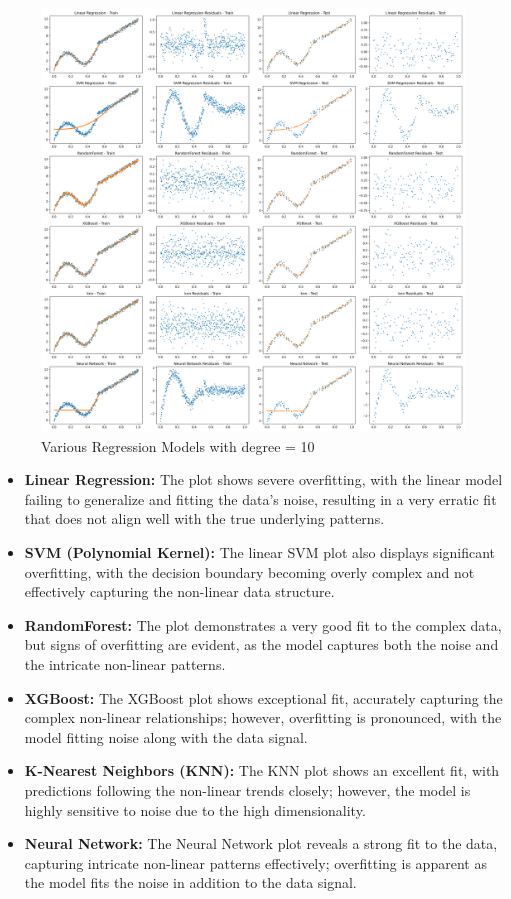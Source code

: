 \begin{figure}[H]
	\centering
	\includegraphics[width=0.8\linewidth]{./Images/E3-MLR3-10.png}
	\caption{Various Regression Models with degree = 10}
\end{figure}

\begin{itemize}
    \item \textbf{Linear Regression:} The plot shows severe overfitting, with the linear model failing to generalize and fitting the data's noise, resulting in a very erratic fit that does not align well with the true underlying patterns.
    \item \textbf{SVM (Polynomial Kernel):} The linear SVM plot also displays significant overfitting, with the decision boundary becoming overly complex and not effectively capturing the non-linear data structure.
    \item \textbf{RandomForest:} The plot demonstrates a very good fit to the complex data, but signs of overfitting are evident, as the model captures both the noise and the intricate non-linear patterns.
    \item \textbf{XGBoost:} The XGBoost plot shows exceptional fit, accurately capturing the complex non-linear relationships; however, overfitting is pronounced, with the model fitting noise along with the data signal.
    \item \textbf{K-Nearest Neighbors (KNN):} The KNN plot shows an excellent fit, with predictions following the non-linear trends closely; however, the model is highly sensitive to noise due to the high dimensionality.
    \item \textbf{Neural Network:} The Neural Network plot reveals a strong fit to the data, capturing intricate non-linear patterns effectively; overfitting is apparent as the model fits the noise in addition to the data signal.
\end{itemize}

